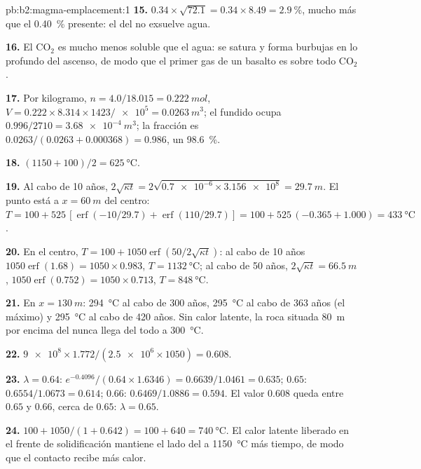 \begin{solution}{pb:b2:magma-emplacement:1}
\textbf{15.} $0.34\times\sqrt{72.1} = 0.34\times8.49 = \qty{2.9}{\percent}$, mucho más que
el \qty{0.40}{\percent} presente: el  del  no exsuelve agua.

\textbf{16.} El CO$_2$ es mucho menos soluble que el agua: se satura y forma burbujas
en lo profundo del ascenso, de modo que el primer gas de un basalto es sobre todo CO$_2$.

\textbf{17.} Por kilogramo, $n = 4.0/18.015 = \qty{0.222}{mol}$, $V = 0.222\times8.314\times1423/
\num{e5} = \qty{0.0263}{m^3}$; el fundido ocupa $0.996/2710 = \qty{3.68e-4}{m^3}$; la
fracción es $0.0263/(0.0263 + 0.000368) = 0.986$, un \qty{98.6}{\percent}.

\textbf{18.} $(1150 + 100)/2 = \qty{625}{\celsius}$.

\textbf{19.} Al cabo de 10 años, $2\sqrt{\kappa t} = 2\sqrt{\num{0.7e-6}\times\num{3.156e8}} =
\qty{29.7}{m}$. El punto está a $x = \qty{60}{m}$ del centro: $T = 100 +
525\,[\operatorname{erf}(-10/29.7) + \operatorname{erf}(110/29.7)] = 100 + 525\,(-0.365 +
1.000) = \qty{433}{\celsius}$.

\textbf{20.} En el centro, $T = 100 + 1050\operatorname{erf}(50/2\sqrt{\kappa t})$: al cabo de
10 años $1050\operatorname{erf}(1.68) = 1050\times0.983$, $T = \qty{1132}{\celsius}$; al cabo de
50 años, $2\sqrt{\kappa t} = \qty{66.5}{m}$, $1050\operatorname{erf}(0.752) = 1050\times0.713$,
$T = \qty{848}{\celsius}$.

\textbf{21.} En $x = \qty{130}{m}$: \qty{294}{\celsius} al cabo de 300 años,
\qty{295}{\celsius} al cabo de 363 años (el máximo) y \qty{295}{\celsius} al cabo de 420
años. Sin calor latente, la roca situada \qty{80}{m} por encima del  nunca llega del todo a
\qty{300}{\celsius}.

\textbf{22.} $\num{9e8}\times1.772/(\num{2.5e6}\times1050) = 0.608$.

\textbf{23.} $\lambda = 0.64$: $e^{-0.4096}/(0.64\times1.6346) = 0.6639/1.0461 = 0.635$;
$0.65$: $0.6554/1.0673 = 0.614$; $0.66$: $0.6469/1.0886 = 0.594$. El valor $0.608$
queda entre $0.65$ y $0.66$, cerca de $0.65$: $\lambda = 0.65$.

\textbf{24.} $100 + 1050/(1 + 0.642) = 100 + 640 = \qty{740}{\celsius}$. El calor
latente liberado en el frente de solidificación mantiene el lado del  a
\qty{1150}{\celsius} más tiempo, de modo que el contacto recibe más calor.


\end{solution}
